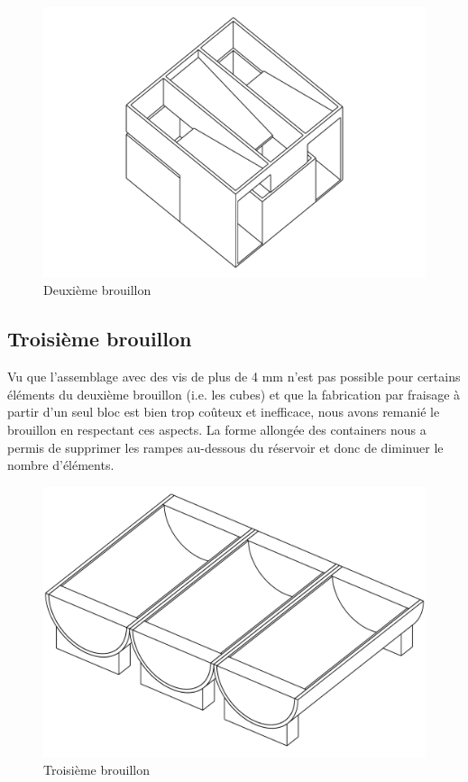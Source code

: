 \begin{figure}
    \centering
    \includegraphics[width=\textwidth]{Graphics/Reservoir_final/DEUXIEME_BROUILLON.pdf}
    \caption{Deuxième brouillon}
\end{figure}

\subsection{Troisième brouillon}
Vu que l'assemblage avec des vis de plus de 4 mm n'est pas possible pour certains éléments du deuxième brouillon (i.e. les cubes) et que la fabrication par fraisage à partir d'un seul bloc est bien trop coûteux et inefficace, nous avons remanié le brouillon en respectant ces aspects. La forme allongée des containers nous a permis de supprimer les rampes au-dessous du réservoir et donc de diminuer le nombre d'éléments.

\begin{figure}
    \centering
    \includegraphics[width=\textwidth]{Graphics/Reservoir_final/TROISIEME_BROUILLON.pdf}
    \caption{Troisième brouillon}
\end{figure}


